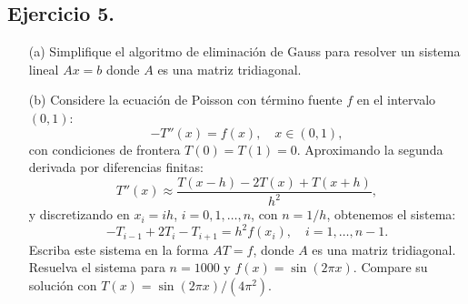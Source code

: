 
\subsection*{Ejercicio 5.}
\begin{enumerate}
    \item[(a)] Simplifique el algoritmo de eliminación de Gauss para resolver un sistema lineal $Ax = b$ donde $A$ es una matriz tridiagonal.
    \item[(b)] Considere la ecuación de Poisson con término fuente $f$ en el intervalo $(0, 1)$:
    \[
    -T''(x) = f(x), \quad x \in (0, 1),
    \]
    con condiciones de frontera $T(0) = T(1) = 0$. Aproximando la segunda derivada por diferencias finitas:
    \[
    T''(x) \approx \frac{T(x-h) - 2T(x) + T(x+h)}{h^2},
    \]
    y discretizando en $x_i = i h$, $i = 0, 1, \ldots, n$, con $n = 1/h$, obtenemos el sistema:
    \[
    -T_{i-1} + 2T_i - T_{i+1} = h^2 f(x_i), \quad i = 1, \ldots, n-1.
    \]
    Escriba este sistema en la forma $A T = f$, donde $A$ es una matriz tridiagonal. Resuelva el sistema para $n = 1000$ y $f(x) = \sin(2\pi x)$. Compare su solución con $T(x) = \sin(2\pi x) / (4\pi^2)$.
\end{enumerate}

